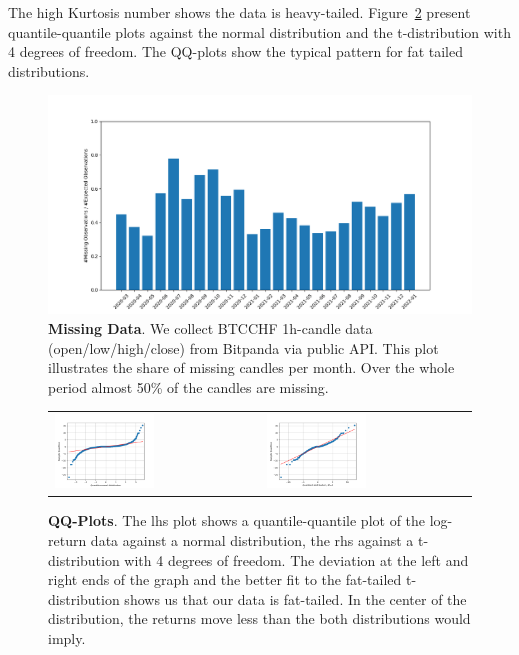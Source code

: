 \documentclass[english,11pt]{article}
\begin{document}
The high Kurtosis number shows the data is heavy-tailed.
Figure~\ref{fig:qqplots} present quantile-quantile plots against the normal distribution
and the t-distribution with 4 degrees of freedom. The QQ-plots show the typical
pattern for fat tailed distributions.

\begin{figure}[h]
    \center
    \includegraphics[width=1\textwidth]{BTCCHFMissingData.png}
    \caption{\textbf{Missing Data}. We collect BTCCHF 1h-candle data
    (open/low/high/close) from Bitpanda via public API.
    This plot illustrates the share of missing candles per month.
    Over the whole period almost 50\% of the candles are missing.}\label{fig:missing}
\end{figure}

\begin{figure}[h]
    \center
    \begin{tabular}{ll}
    \includegraphics[width=0.5\textwidth]{qq_normal.png} &
    \includegraphics[width=0.5\textwidth]{qq_tdist.png} \\
    \end{tabular}
    \caption{\textbf{QQ-Plots}. The lhs plot shows a quantile-quantile plot
    of the log-return data against a normal distribution, the rhs
    against a t-distribution with 4 degrees of freedom.
    The deviation at the left and right ends of the graph and the better 
    fit to the fat-tailed t-distribution shows us that our data
    is fat-tailed. In the center of the distribution, the 
    returns move less than the both distributions would imply.}\label{fig:qqplots}
\end{figure}
\end{document}
